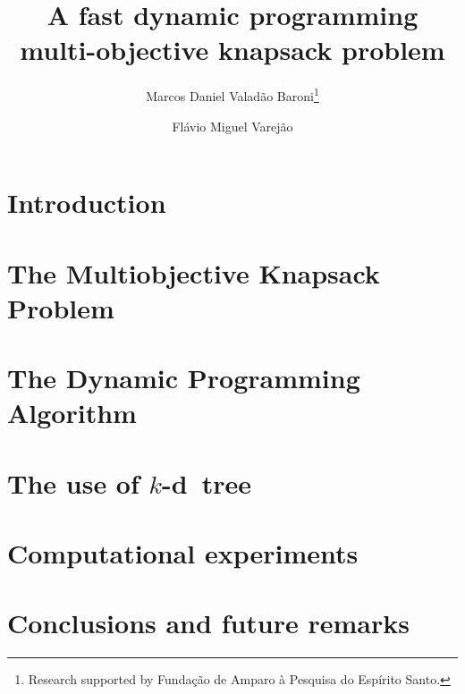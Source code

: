 \documentclass{article}
\newcommand{\kdtree}{$k$-d~tree}
\begin{document}
\title{A fast dynamic programming multi-objective knapsack problem}

\author{
   Marcos Daniel Valad\~ao Baroni\thanks{Research supported by Funda\c c\~ao de Amparo \`a Pesquisa do Esp\'irito Santo.}
   \and
   Fl\'avio Miguel Varej\~ao
}





\maketitle

\begin{abstract}

\end{abstract}

\section{Introduction}
\label{sec:intro}


\section{The Multiobjective Knapsack Problem}
\label{sec:mokp}


\section{The Dynamic Programming Algorithm}
\label{sec:progdyn}


\section{The use of \kdtree{}}
\label{sec:kdtree}


\section{Computational experiments}
\label{sec:exp}


\section{Conclusions and future remarks}
\label{sec:conc}




\end{document}
